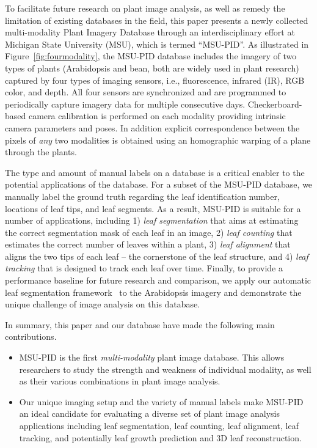 To facilitate future research on plant image analysis, as well as remedy the limitation of existing databases in the field, this paper presents a newly collected multi-modality Plant Imagery Database through an interdisciplinary effort at Michigan State University (MSU), which is termed ``MSU-PID''.
As illustrated in Figure~\ref{fig:fourmodality}, the MSU-PID database includes the imagery of two types of plants (Arabidopsis and bean, both are widely used in plant research) captured by four types of imaging sensors, i.e., fluorescence, infrared (IR), RGB color, and depth.
All four sensors are synchronized and are programmed to periodically capture imagery data for multiple consecutive days.
Checkerboard-based camera calibration is performed on each modality providing intrinsic camera parameters and poses.  In addition explicit correspondence between the pixels of {\it any} two modalities is obtained using an homographic warping of a plane through the plants.


The type and amount of manual labels on a database is a critical enabler to the potential applications of the database.
For a subset of the MSU-PID database, we manually label the ground truth regarding the leaf identification number, locations of leaf tips, and leaf segments.
As a result, MSU-PID is suitable for a number of applications, including 1) {\it leaf segmentation} that aims at estimating the correct segmentation mask of each leaf in an image, 2) {\it leaf counting} that estimates the correct number of leaves within a plant, 3) {\it leaf alignment} that aligns the two tips of each leaf -- the cornerstone of the leaf structure, and 4) {\it leaf tracking} that is designed to track each leaf over time.
Finally, to provide a performance baseline for future research and comparison, we apply our automatic leaf segmentation framework~\cite{yin2014a,yin2014b} to the Arabidopsis imagery and demonstrate the unique challenge of image analysis on this database.

In summary, this paper and our database have made the following main contributions.
\begin{itemize}
\item MSU-PID is the first {\it multi-modality} plant image database. This allows researchers to study the strength and weakness of individual modality, as well as their various combinations in plant image analysis.
\item Our unique imaging setup and the variety of manual labels make MSU-PID an ideal candidate for evaluating a diverse set of plant image analysis applications including leaf segmentation, leaf counting, leaf alignment, leaf tracking, and potentially leaf growth prediction and $3$D leaf reconstruction.
\end{itemize}


